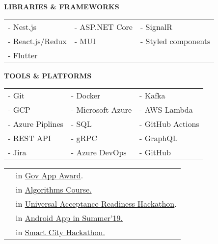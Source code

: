 \documentclass[10pt,a4paper,ragged2e]{altacv}
\begin{document}
\smallskip
\divider

\textcolor{VividPurple}{\textbf{LIBRARIES \& FRAMEWORKS}}
\medskip

\begin{tabular}{ l l l } 
	- Nest.js        & - ASP.NET Core & - SignalR           \\
	- React.js/Redux & - MUI          & - Styled components \\ 
	- Flutter
\end{tabular}

\smallskip
\divider

\textcolor{VividPurple}{\textbf{TOOLS \& PLATFORMS}}
\medskip

\begin{tabular}{ l l l }
	- Git            & - Docker          & - Kafka          \\
	- GCP            & - Microsoft Azure & - AWS Lambda     \\
	- Azure Piplines & - SQL             & - GitHub Actions \\
	- REST API       & - gRPC            & - GraphQL        \\
	- Jira           & - Azure DevOps    & - GitHub         \\ 
\end{tabular}
\smallskip

\smallskip

\begin{tabular}{ l l }
	\faTrophy &  in \href{https://www.linkedin.com/feed/update/urn:li:activity:6711649526421295104/}{Gov App Award}.         \\
	\faTrophy &  in \href{https://github.com/zero-based/RSA/tree/master/BigInteger}{Algorithms Course.}               \\ 
	\faTrophy &  in \href{https://www.linkedin.com/feed/update/urn:li:activity:6572611476543025152/}{Universal Acceptance Readiness Hackathon}.  \\
	\faTrophy &  in \href{https://www.facebook.com/permalink.php?story_fbid=2077703849203331 & id=1839142163059502}{Android App in Summer’19.} \\
	\faTrophy &  in \href{https://www.linkedin.com/feed/update/urn:li:activity:6607030838808846336/}{Smart City Hackathon.}                \\
\end{tabular}

\clearpage

\end{document}
